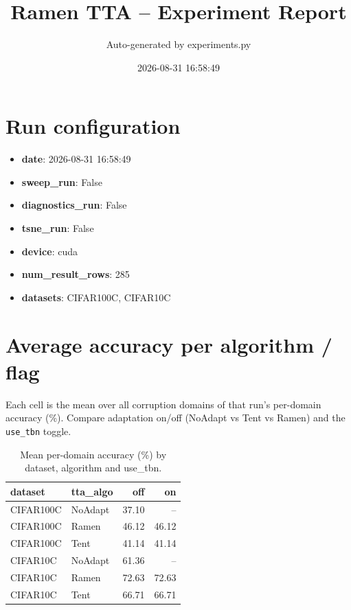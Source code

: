 \documentclass[11pt]{article}
\title{Ramen TTA -- Experiment Report}
\author{Auto-generated by experiments.py}
\date{2026-08-31 16:58:49}
\begin{document}
\maketitle

\section{Run configuration}
\begin{itemize}

  \item \textbf{date}: 2026-08-31 16:58:49

  \item \textbf{sweep\_run}: False

  \item \textbf{diagnostics\_run}: False

  \item \textbf{tsne\_run}: False

  \item \textbf{device}: cuda

  \item \textbf{num\_result\_rows}: 285

  \item \textbf{datasets}: CIFAR100C, CIFAR10C

\end{itemize}

\section{Average accuracy per algorithm / flag}

Each cell is the mean over all corruption domains of that run's per-domain accuracy (\%). Compare adaptation on/off (NoAdapt vs Tent vs Ramen) and the \texttt{use\_tbn} toggle.


\begin{table}[H]
\centering
\small
\begin{tabular}{llrr}
\toprule
dataset & tta\_algo & off & on \\
\midrule
CIFAR100C & NoAdapt & 37.10 & -- \\
CIFAR100C & Ramen & 46.12 & 46.12 \\
CIFAR100C & Tent & 41.14 & 41.14 \\
CIFAR10C & NoAdapt & 61.36 & -- \\
CIFAR10C & Ramen & 72.63 & 72.63 \\
CIFAR10C & Tent & 66.71 & 66.71 \\
\bottomrule
\end{tabular}

\caption{Mean per-domain accuracy (\%) by dataset, algorithm and use\_tbn.}
\end{table}
\end{document}
